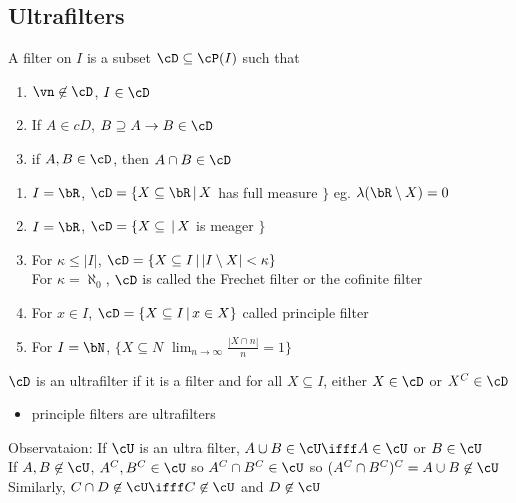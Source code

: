 
\subsection{Ultrafilters}

\begin{definition}
    A filter on $I$ is a subset $\cD \subseteq \cP(I)$ such that 
    \begin{enumerate}[label = (\roman*)]
        \item $\vn \not\in \cD$, $I \in \cD$
        \item If $A \in cD$, $B \supseteq A \to B \in \cD$ 
        \item if $A, B \in \cD$, then $A \cap B \in \cD$ 
    \end{enumerate} 
\end{definition}

\begin{example}
    \begin{enumerate}[label = (\alph*)]
        \item $I  = \bR$, $\cD = \{X \subseteq \bR \, | \, X$ has full measure $\}$ eg. $\lambda(\bR \setminus X) = 0$
        \item $I  = \bR$, $\cD = \{X \subseteq \, | \, X$ is meager $\}$ 
        \item For $\kappa \le |I|$, $\cD = \{X \subseteq I \, | \, |I \setminus X| < \kappa\}$ \\
        For $\kappa = \aleph_0$, $\cD$ is called the Frechet filter or the cofinite filter
        \item For $x \in I$, $\cD = \{X \subseteq I \, | \, x \in X\}$ called principle filter 
        \item For $I = \bN$, $\{X \subseteq N \, \, \lim_{ n \to \infty} \frac{|X \cap n|}{n} = 1\}$ 
    \end{enumerate}
\end{example}

\begin{definition}
    $\cD$ is an ultrafilter if it is a filter and for all $X \subseteq I$, either $X \in \cD$ or $X^C \in \cD$ 
\end{definition}

\begin{itemize}
    \item principle filters are ultrafilters 
\end{itemize}

\noindent
Observataion: If $\cU$ is an ultra filter, $A \cup B \in \cU \ifff A \in \cU$ or $B \in \cU$ \\
If $A, B \not\in \cU$, $A^C, B^C \in \cU$ so $A^C \cap B^C \in \cU$ so $(A^C \cap B^C)^C =A \cup B \not\in \cU$ \\
Similarly, $C \cap D \not\in \cU \ifff C \not\in \cU$ and $D \not\in\cU$ 

